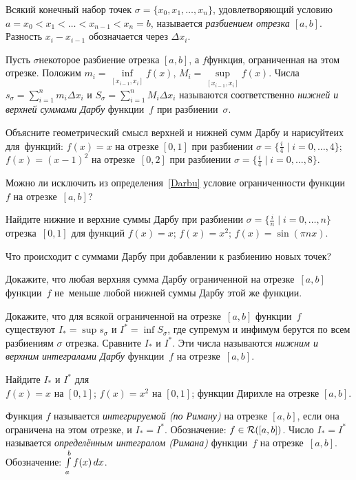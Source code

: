 \documentclass[a4paper,12pt]{article}
\newcommand{\Rim}[2]{{\cal R}([#1,#2])}
\newcommand{\RimAB}{\Rim {a}{b}}
\begin{document}


Всякий конечный набор точек $\sigma=\{x_0,x_1,\ldots,x_n\}$, удовлетворяющий условию $a=x_0 < x_1 < \ldots < x_{n-1} < x_n = b$, называется \emph{разбиением отрезка $[a,b]$}. Разность $x_i - x_{i-1}$ обозначается через $\Delta x_i$.

\label{Darbu}
Пусть $\sigma$\т некоторое разбиение отрезка $[a,b]$, а $f$\т функция, ограниченная на этом отрезке. 
Положим
$m_i=\inf\limits_{[x_{i-1}, x_i]}f(x)$,
$M_i=\sup\limits_{[x_{i-1}, x_i]}f(x)$.
Числа $s_{\sigma}=\sum\limits_{i=1}^n m_i\Delta x_i$ и $S_{\sigma}=\sum\limits_{i=1}^n M_i\Delta x_i$ называются соответственно \emph{нижней и верхней суммами Дарбу} функции~$f$ при разбиении~$\sigma$.

Объясните геометрический смысл верхней и нижней сумм Дарбу и  нарисуйте их для~функций:
$f(x)=x$ на отрезке $[0,1]$ при разбиении $\sigma=\{\frac i4 \mid i=0,\ldots,4\}$;\\ 
$f(x)=(x-1)^2$ на отрезке~$[0,2]$ при разбиении $\sigma=\{\frac i4 \mid i=0,\ldots,8\}$.

Можно ли исключить из определения~\ref{Darbu} условие ограниченности функции~$f$ на отрезке~$[a,b]$?

Найдите нижние и верхние суммы Дарбу при разбиении $\sigma=\{\frac in \mid i=0,\ldots,n \}$ отрезка~$[0,1]$ для функций
 $f(x)=x$;
 $f(x)=x^2$;
 $f(x)=\sin(\pi nx)$.

Что происходит с суммами Дарбу при добавлении к разбиению новых точек?

Докажите, что любая верхняя сумма Дарбу ограниченной на отрезке~$[a,b]$ функции~$f$ не~меньше любой нижней суммы Дарбу этой же функции.

Докажите, что для всякой ограниченной на отрезке~$[a,b]$ функции~$f$ существуют $I_*=\sup s_\sigma$ и $I^*=\inf S_\sigma$, где супремум и инфимум берутся по всем разбиениям $\sigma$ отрезка. Сравните $I_*$ и $I^*$. Эти числа называются
\emph{нижним и верхним интегралами Дарбу} функции~$f$ на отрезке~$[a,b]$.

Найдите $I_*$ и $I^*$ для\\
 $f(x)=x$ на $[0,1]$;
 $f(x)=x^2$ на $[0,1]$;
 функции Дирихле на отрезке $[a,b]$.

Функция $f$ называется \emph{интегрируемой (по Риману)} на отрезке $[a,b]$, если она ограничена на этом отрезке, и $I_* =I^*$. Обозначение: $f\in\RimAB$. Число $I_* =I^*$ называется \emph{определённым интегралом (Римана)} функции~$f$ на отрезке~$[a,b]$. Обозначение: $\int\limits_{{a}}^{{b}}f(x)\,dx$.
\end{document}
